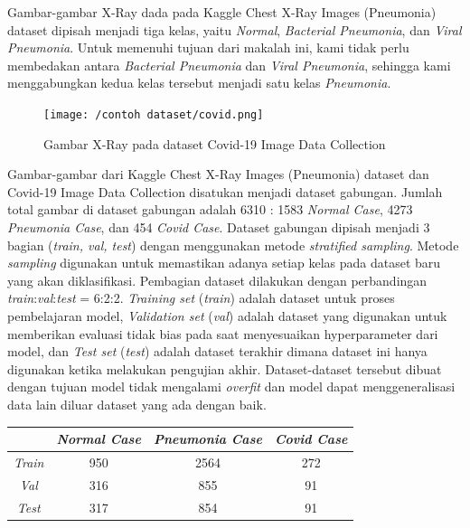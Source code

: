 \documentclass{article}
\begin{document}
	\par
	Gambar-gambar X-Ray dada pada Kaggle Chest X-Ray Images (Pneumonia) dataset dipisah menjadi tiga kelas, yaitu \textit{Normal}, \textit{Bacterial Pneumonia}, dan \textit{Viral Pneumonia}. Untuk memenuhi tujuan dari makalah ini, kami tidak perlu membedakan antara \textit{Bacterial Pneumonia} dan \textit{Viral Pneumonia}, sehingga kami menggabungkan kedua kelas tersebut menjadi satu kelas \textit{Pneumonia}.
	\par
	
	\begin{figure}[H]
		\centering
		\texttt{[image: /contoh dataset/covid.png]}
		\caption{Gambar X-Ray pada dataset Covid-19 Image Data Collection}
	\end{figure}   
	    
	\par
	Gambar-gambar dari Kaggle Chest X-Ray Images (Pneumonia) dataset dan Covid-19 Image Data Collection disatukan menjadi dataset gabungan. Jumlah total gambar di dataset gabungan adalah 6310 : 1583 \textit{Normal Case}, 4273 \textit{Pneumonia Case}, dan 454 \textit{Covid Case}. Dataset gabungan dipisah menjadi 3 bagian (\textit{train, val, test}) dengan menggunakan metode \textit{stratified 
	sampling}. Metode \textit{sampling} digunakan untuk memastikan adanya setiap kelas pada dataset baru yang 
	akan diklasifikasi. Pembagian dataset dilakukan dengan  perbandingan \textit{train}:\textit{val}:\textit{test} = 6:2:2. \textit{Training set} (\textit{train})
	adalah dataset untuk proses pembelajaran model, \textit{Validation set} (\textit{val}) adalah dataset yang digunakan 
	untuk memberikan evaluasi tidak bias pada saat menyesuaikan hyperparameter dari model, dan \textit{Test 
	set} (\textit{test}) adalah dataset terakhir dimana dataset ini hanya digunakan ketika melakukan pengujian 
	akhir. Dataset-dataset tersebut dibuat dengan tujuan model tidak mengalami \textit{overfit} dan model dapat 
	menggeneralisasi data lain diluar dataset yang ada dengan baik.

   	\begin{center}
		\begin{tabular}{|c|c|c|c|}
			\hline
			& \textit{Normal Case} & \textit{Pneumonia Case} & \textit{Covid Case} \\
			\hline
			\textit{Train} & 950 & 2564 & 272 \\
			\hline
			\textit{Val} & 316 & 855 & 91 \\
			\hline
			\textit{Test} & 317 & 854 & 91 \\
			\hline
		\end{tabular}
	\end{center}
	
\end{document}
